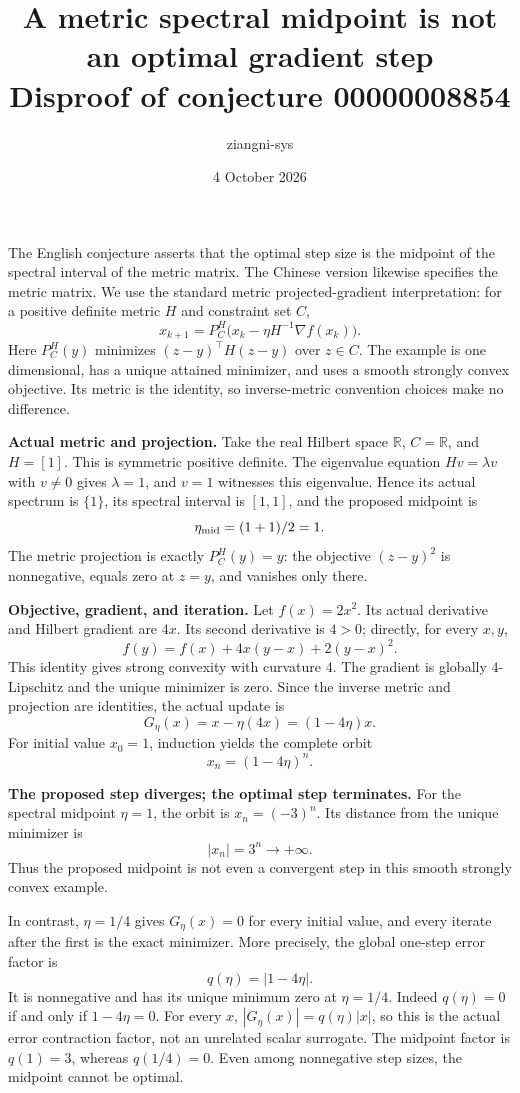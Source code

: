 \documentclass[11pt]{article}
\title{A metric spectral midpoint is not an optimal gradient step\\
\large Disproof of conjecture 00000008854}
\author{ziangni-sys}
\date{4 October 2026}
\begin{document}
\maketitle
The English conjecture asserts that the optimal step size is the midpoint
of the spectral interval of the metric matrix. The Chinese version likewise
specifies the metric matrix. We use the standard metric projected-gradient
interpretation: for a positive definite metric $H$ and constraint set $C$,
\[
 x_{k+1}=P_C^H\bigl(x_k-\eta H^{-1}\nabla f(x_k)\bigr).
\]
Here $P_C^H(y)$ minimizes $(z-y)^\top H(z-y)$ over $z\in C$.
The example is one dimensional, has a unique attained minimizer, and
uses a smooth strongly convex objective. Its metric is the identity, so
inverse-metric convention choices make no difference.

\textbf{Actual metric and projection.}
Take the real Hilbert space $\mathbb R$, $C=\mathbb R$, and $H=[1]$.
This is symmetric positive definite. The eigenvalue equation $Hv=\lambda v$
with $v\ne0$ gives $\lambda=1$, and $v=1$ witnesses this eigenvalue.
Hence its actual spectrum is $\{1\}$, its spectral interval is $[1,1]$,
and the proposed midpoint is
\[
 \eta_{\rm mid}=(1+1)/2=1.
\]
The metric projection is exactly $P_C^H(y)=y$: the objective
$(z-y)^2$ is nonnegative, equals zero at $z=y$, and vanishes only there.

\textbf{Objective, gradient, and iteration.}
Let $f(x)=2x^2$. Its actual derivative and Hilbert gradient are $4x$.
Its second derivative is $4>0$; directly, for every $x,y$,
\[
 f(y)=f(x)+4x(y-x)+2(y-x)^2.
\]
This identity gives strong convexity with curvature $4$.
The gradient is globally $4$-Lipschitz and the unique minimizer is zero.
Since the inverse metric and projection are identities, the actual update is
\[
 G_\eta(x)=x-\eta(4x)=(1-4\eta)x.
\]
For initial value $x_0=1$, induction yields the complete orbit
\[
 x_n=(1-4\eta)^n.
\]

\newpage
\textbf{The proposed step diverges; the optimal step terminates.}
For the spectral midpoint $\eta=1$, the orbit is $x_n=(-3)^n$.
Its distance from the unique minimizer is
\[
 |x_n|=3^n\longrightarrow+\infty.
\]
Thus the proposed midpoint is not even a convergent step in this
smooth strongly convex example.

In contrast, $\eta=1/4$ gives $G_\eta(x)=0$ for every initial value,
and every iterate after the first is the exact minimizer. More precisely,
the global one-step error factor is
\[
 q(\eta)=|1-4\eta|.
\]
It is nonnegative and has its unique minimum zero at $\eta=1/4$.
Indeed $q(\eta)=0$ if and only if $1-4\eta=0$. For every $x$,
$|G_\eta(x)|=q(\eta)|x|$, so this is the actual error contraction
factor, not an unrelated scalar surrogate.
The midpoint factor is $q(1)=3$, whereas $q(1/4)=0$.
Even among nonnegative step sizes, the midpoint cannot be optimal.
\end{document}

